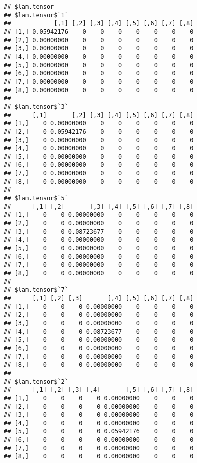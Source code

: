 \documentclass[
]{article}
\begin{document}
\begin{verbatim}
## $lam.tensor
## $lam.tensor$`1`
##            [,1] [,2] [,3] [,4] [,5] [,6] [,7] [,8]
## [1,] 0.05942176    0    0    0    0    0    0    0
## [2,] 0.00000000    0    0    0    0    0    0    0
## [3,] 0.00000000    0    0    0    0    0    0    0
## [4,] 0.00000000    0    0    0    0    0    0    0
## [5,] 0.00000000    0    0    0    0    0    0    0
## [6,] 0.00000000    0    0    0    0    0    0    0
## [7,] 0.00000000    0    0    0    0    0    0    0
## [8,] 0.00000000    0    0    0    0    0    0    0
## 
## $lam.tensor$`3`
##      [,1]       [,2] [,3] [,4] [,5] [,6] [,7] [,8]
## [1,]    0 0.00000000    0    0    0    0    0    0
## [2,]    0 0.05942176    0    0    0    0    0    0
## [3,]    0 0.00000000    0    0    0    0    0    0
## [4,]    0 0.00000000    0    0    0    0    0    0
## [5,]    0 0.00000000    0    0    0    0    0    0
## [6,]    0 0.00000000    0    0    0    0    0    0
## [7,]    0 0.00000000    0    0    0    0    0    0
## [8,]    0 0.00000000    0    0    0    0    0    0
## 
## $lam.tensor$`5`
##      [,1] [,2]       [,3] [,4] [,5] [,6] [,7] [,8]
## [1,]    0    0 0.00000000    0    0    0    0    0
## [2,]    0    0 0.00000000    0    0    0    0    0
## [3,]    0    0 0.08723677    0    0    0    0    0
## [4,]    0    0 0.00000000    0    0    0    0    0
## [5,]    0    0 0.00000000    0    0    0    0    0
## [6,]    0    0 0.00000000    0    0    0    0    0
## [7,]    0    0 0.00000000    0    0    0    0    0
## [8,]    0    0 0.00000000    0    0    0    0    0
## 
## $lam.tensor$`7`
##      [,1] [,2] [,3]       [,4] [,5] [,6] [,7] [,8]
## [1,]    0    0    0 0.00000000    0    0    0    0
## [2,]    0    0    0 0.00000000    0    0    0    0
## [3,]    0    0    0 0.00000000    0    0    0    0
## [4,]    0    0    0 0.08723677    0    0    0    0
## [5,]    0    0    0 0.00000000    0    0    0    0
## [6,]    0    0    0 0.00000000    0    0    0    0
## [7,]    0    0    0 0.00000000    0    0    0    0
## [8,]    0    0    0 0.00000000    0    0    0    0
## 
## $lam.tensor$`2`
##      [,1] [,2] [,3] [,4]       [,5] [,6] [,7] [,8]
## [1,]    0    0    0    0 0.00000000    0    0    0
## [2,]    0    0    0    0 0.00000000    0    0    0
## [3,]    0    0    0    0 0.00000000    0    0    0
## [4,]    0    0    0    0 0.00000000    0    0    0
## [5,]    0    0    0    0 0.05942176    0    0    0
## [6,]    0    0    0    0 0.00000000    0    0    0
## [7,]    0    0    0    0 0.00000000    0    0    0
## [8,]    0    0    0    0 0.00000000    0    0    0

\end{verbatim}
\end{document}
